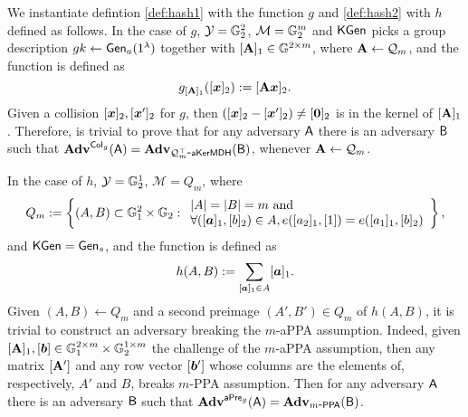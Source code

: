 We instantiate defintion \ref{def:hash1} with the function $g$ and \ref{def:hash2}  with $h$ defined as follows. In the case of $g$, $\mathcal{Y}=\mathbb{G}_2^2$, $\mathcal{M}=\mathbb{G}_2^m$ and $\mathsf{KGen}$ picks a group description $gk\gets\mathsf{Gen}_a(1^\lambda)$ together with $[\mathbf{{A}}]_1\in\mathbb{G}^{2\times m}$, where $\mathbf{{A}}\gets\mathcal{Q}_m$, and the function is defined as
$$
g_{[\mathbf{{A}}]_1}([{\boldsymbol{x}}]_2):= [\mathbf{{A}}{\boldsymbol{x}}]_2.
$$
Given a collision $[{\boldsymbol{x}}]_2,[{\boldsymbol{x}}']_2$ for $g$, then $([{\boldsymbol{x}}]_2-[{\boldsymbol{x}}']_2)\neq [{\boldsymbol{0}}]_2$ is in the kernel of $[\mathbf{{A}} ]_1$. Therefore, is trivial to prove that for any adversary $\mathsf{A}$ there is an adversary $\mathsf{B}$ such that $\mathbf{Adv}^{\mathsf{Col}_g}(\mathsf{A})=\mathbf{Adv}_{\mathcal{Q}_m^\top\mbox{-}\mathsf{aKerMDH}}(\mathsf{B})$, whenever $\mathbf{{A}}\gets\mathcal{Q}_m$.


In the case of $h$, $\mathcal{Y}=\mathbb{G}_2^1$, $\mathcal{M}=Q_m$, where
$$
Q_m := \left\{
(A,B)\subset\mathbb{G}_1^{2}\times\mathbb{G}_2:
\begin{array}{l} 
{|A|=|B|=m\text{ and }}\\
{\forall ([{\boldsymbol{a}}]_1,[b]_2)\in A,e([a_2]_1,[1])=e([a_1]_1,[b]_2)}
\end{array}
\right\},
$$ and $\mathsf{KGen}=\mathsf{Gen}_s$, and the function is defined as
$$
h(A,B):= \sum_{[{\boldsymbol{a}}]_1\in A}[{\boldsymbol{a}}]_1.
$$
Given $(A,B)\gets Q_m$ and a second preimage $(A',B')\in Q_m$ of $h(A,B)$, it is trivial to construct an adversary breaking the $m$-aPPA assumption. Indeed, given $[\mathbf{{A}}]_1,[{\boldsymbol{b}}]\in\mathbb{G}_1^{2\times m}\times \mathbb{G}_2^{1\times m}$ the challenge of the $m$-aPPA assumption, then any matrix $[\mathbf{{A}}']$ and any row vector $[{\boldsymbol{b}}']$ whose columns are the elements of, respectively, $A'$ and $B$, breaks $m$-PPA assumption. Then for any adversary $\mathsf{A}$ there is an adversary $\mathsf{B}$ such that $\mathbf{Adv}^{\mathsf{aPre}_g}(\mathsf{A})=\mathbf{Adv}_{m\mbox{-}\mathsf{PPA}}(\mathsf{B})$.

